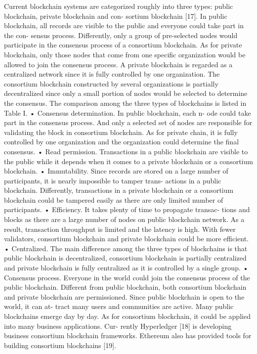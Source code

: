 \documentclass[conference]{IEEEtran}
\begin{document}
Current blockchain systems are categorized roughly into
three types: public blockchain, private blockchain and con-
sortium blockchain [17]. In public blockchain, all records are
visible to the public and everyone could take part in the con-
sensus process. Differently, only a group of pre-selected nodes
would participate in the consensus process of a consortium
blockchain. As for private blockchain, only those nodes that
come from one specific organization would be allowed to join
the consensus process.
A private blockchain is regarded as a centralized network
since it is fully controlled by one organization. The consortium
blockchain constructed by several organizations is partially
decentralized since only a small portion of nodes would be
selected to determine the consensus. The comparison among
the three types of blockchains is listed in Table I.
• Consensus determination. In public blockchain, each n-
ode could take part in the consensus process. And only
a selected set of nodes are responsible for validating the
block in consortium blockchain. As for private chain, it is
fully controlled by one organization and the organization
could determine the final consensus.
• Read permission. Transactions in a public blockchain are
visible to the public while it depends when it comes to a
private blockchain or a consortium blockchain.
• Immutability. Since records are stored on a large number
of participants, it is nearly impossible to tamper trans-
actions in a public blockchain. Differently, transactions
in a private blockchain or a consortium blockchain could
be tampered easily as there are only limited number of
participants.
• Efficiency. It takes plenty of time to propagate transac-
tions and blocks as there are a large number of nodes
on public blockchain network. As a result, transaction
throughput is limited and the latency is high. With fewer
validators, consortium blockchain and private blockchain
could be more efficient.
• Centralized. The main difference among the three types
of blockchains is that public blockchain is decentralized,
consortium blockchain is partially centralized and private
blockchain is fully centralized as it is controlled by a
single group.
• Consensus process. Everyone in the world could join
the consensus process of the public blockchain. Different
from public blockchain, both consortium blockchain and
private blockchain are permissioned.
Since public blockchain is open to the world, it can at-
tract many users and communities are active. Many public
blockchains emerge day by day. As for consortium blockchain,
it could be applied into many business applications. Cur-
rently Hyperledger [18] is developing business consortium
blockchain frameworks. Ethereum also has provided tools for
building consortium blockchains [19].
\end{document}

